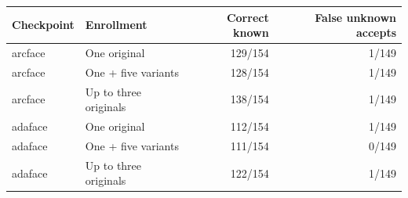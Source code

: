 \begin{tabular}{llrr}
\hline
Checkpoint & Enrollment & Correct known & False unknown accepts \\
\hline
arcface & One original & 129/154 & 1/149 \\
arcface & One + five variants & 128/154 & 1/149 \\
arcface & Up to three originals & 138/154 & 1/149 \\
adaface & One original & 112/154 & 1/149 \\
adaface & One + five variants & 111/154 & 0/149 \\
adaface & Up to three originals & 122/154 & 1/149 \\
\hline
\end{tabular}
